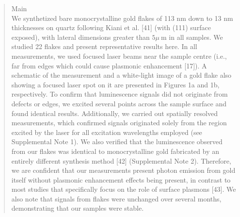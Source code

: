 \documentclass[10pt]{article}
\begin{document}
\begin{abstract}
Main\\[0pt]
We synthetized bare monocrystalline gold flakes of 113 nm down to 13 nm thicknesses on quartz following Kiani et al. [41] (with (111) surface exposed), with lateral dimensions greater than $5 \mu \mathrm{~m}$ in all samples. We studied 22 flakes and present representative results here. In all measurements, we used focused laser beams near the sample centre (i.e., far from edges which could cause plasmonic enhancement [17]). A schematic of the measurement and a white-light image of a gold flake also showing a focused laser spot on it are presented in Figures 1a and 1b, respectively. To confirm that luminescence signals did not originate from defects or edges, we excited several points across the sample surface and found identical results. Additionally, we carried out spatially resolved measurements, which confirmed signals originated solely from the region excited by the laser for all excitation wavelengths employed (see Supplemental Note 1). We also verified that the luminescence observed from our flakes was identical to monocrystalline gold fabricated by an entirely different synthesis method [42] (Supplemental Note 2). Therefore, we are confident that our measurements present photon emission from gold itself without plasmonic enhancement effects being present, in contrast to most studies that specifically focus on the role of surface plasmons [43]. We also note that signals from flakes were unchanged over several months, demonstrating that our samples were stable.
\end{abstract}
\end{document}

